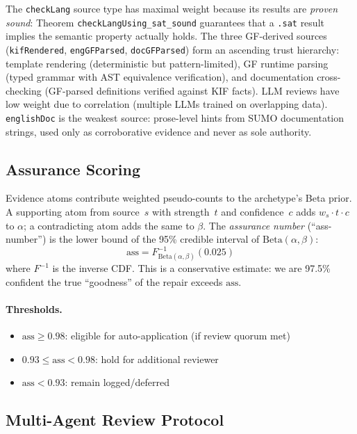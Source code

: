 \documentclass[11pt]{article}
\theoremstyle{definition}
\theoremstyle{plain}
\begin{document}
The \texttt{checkLang} source type has maximal weight because its
results are \emph{proven sound}: Theorem
\texttt{checkLangUsing\_sat\_sound} guarantees that a \texttt{.sat}
result implies the semantic property actually holds.
The three GF-derived sources (\texttt{kifRendered}, \texttt{engGFParsed},
\texttt{docGFParsed}) form an ascending trust hierarchy:
template rendering (deterministic but pattern-limited),
GF runtime parsing (typed grammar with AST equivalence verification),
and documentation cross-checking (GF-parsed definitions verified
against KIF facts).
LLM reviews have low weight due to correlation (multiple LLMs trained
on overlapping data).  \texttt{englishDoc} is the weakest source:
prose-level hints from SUMO documentation strings, used only as
corroborative evidence and never as sole authority.

\subsection{Assurance Scoring}

Evidence atoms contribute weighted pseudo-counts to the archetype's
Beta prior.  A supporting atom from source~$s$ with strength~$t$
and confidence~$c$ adds $w_s \cdot t \cdot c$ to $\alpha$; a
contradicting atom adds the same to $\beta$.  The
\emph{assurance number} (``ass-number'') is the lower bound of
the 95\% credible interval of $\text{Beta}(\alpha, \beta)$:
\[
  \text{ass} = F^{-1}_{\text{Beta}(\alpha,\beta)}(0.025)
\]
where $F^{-1}$ is the inverse CDF\@.  This is a conservative
estimate: we are 97.5\% confident the true ``goodness'' of the
repair exceeds $\text{ass}$.

\paragraph{Thresholds.}
\begin{itemize}[nosep]
  \item $\text{ass} \geq 0.98$: eligible for auto-application
    (if review quorum met)
  \item $0.93 \leq \text{ass} < 0.98$: hold for additional reviewer
  \item $\text{ass} < 0.93$: remain logged/deferred
\end{itemize}

\subsection{Multi-Agent Review Protocol}
\end{document}
